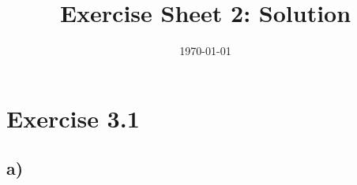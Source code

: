 \documentclass[a4paper]{article}
\begin{document}
\title{Exercise Sheet 2: Solution}
\author{}
\date{\today}



\section{Exercise 3.1}
\subsection{a)}
\end{document}
